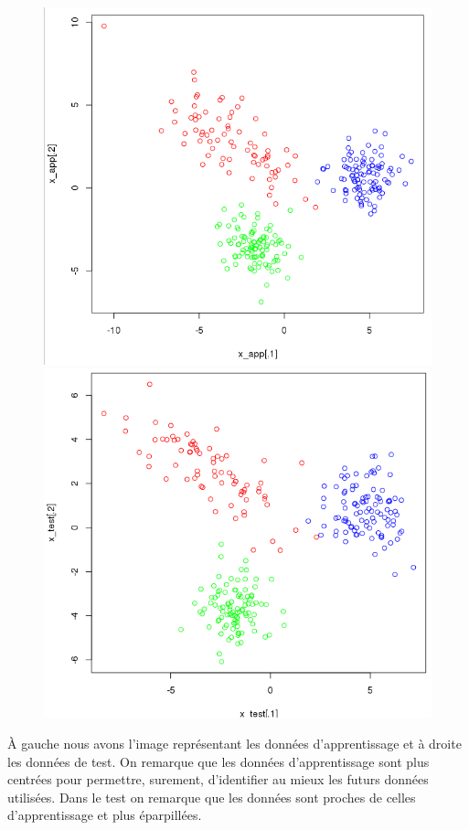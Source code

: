\documentclass[a4paper,12pt]{report}
\begin{document}
\begin{figure}[!ht]
	\center
	\includegraphics[scale=0.3]{image/q1_1.png}
	\includegraphics[scale=0.3]{image/q1_2.png}
\end{figure}

À gauche nous avons l'image représentant les données d'apprentissage et à droite les données de test.
On remarque que les données d'apprentissage sont plus centrées pour permettre, surement, d'identifier au mieux les futurs données utilisées. Dans le test on remarque que les données sont proches de celles d'apprentissage et plus éparpillées. 
\end{document}
